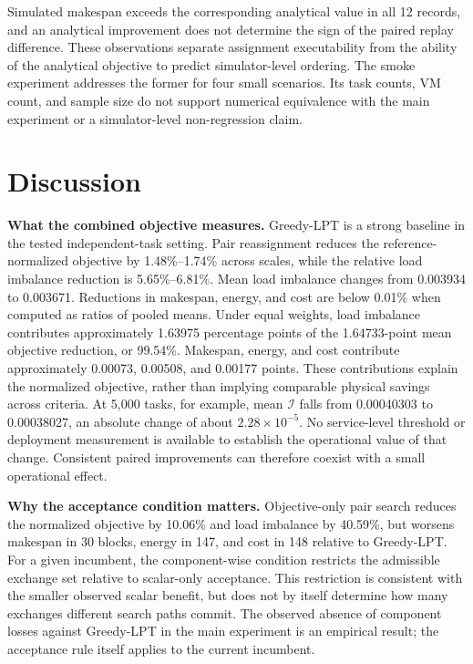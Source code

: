 \documentclass[pdflatex,onecolumn,sn-mathphys-num]{sn-jnl}
\begin{document}
Simulated makespan exceeds the corresponding analytical value in all 12 records, and an analytical improvement does not determine the sign of the paired replay difference. These observations separate assignment executability from the ability of the analytical objective to predict simulator-level ordering. The smoke experiment addresses the former for four small scenarios. Its task counts, VM count, and sample size do not support numerical equivalence with the main experiment or a simulator-level non-regression claim.

\FloatBarrier

\section{Discussion}\label{sec6}

\textbf{What the combined objective measures.}
Greedy-LPT is a strong baseline in the tested independent-task setting. Pair reassignment reduces the reference-normalized objective by 1.48\%--1.74\% across scales, while the relative load imbalance reduction is 5.65\%--6.81\%. Mean load imbalance changes from 0.003934 to 0.003671. Reductions in makespan, energy, and cost are below 0.01\% when computed as ratios of pooled means. Under equal weights, load imbalance contributes approximately 1.63975 percentage points of the 1.64733-point mean objective reduction, or 99.54\%. Makespan, energy, and cost contribute approximately 0.00073, 0.00508, and 0.00177 points. These contributions explain the normalized objective, rather than implying comparable physical savings across criteria. At 5,000 tasks, for example, mean $\mathcal{I}$ falls from 0.00040303 to 0.00038027, an absolute change of about $2.28\times10^{-5}$. No service-level threshold or deployment measurement is available to establish the operational value of that change. Consistent paired improvements can therefore coexist with a small operational effect.

\textbf{Why the acceptance condition matters.}
Objective-only pair search reduces the normalized objective by 10.06\% and load imbalance by 40.59\%, but worsens makespan in 30 blocks, energy in 147, and cost in 148 relative to Greedy-LPT. For a given incumbent, the component-wise condition restricts the admissible exchange set relative to scalar-only acceptance. This restriction is consistent with the smaller observed scalar benefit, but does not by itself determine how many exchanges different search paths commit. The observed absence of component losses against Greedy-LPT in the main experiment is an empirical result; the acceptance rule itself applies to the current incumbent.
\end{document}
